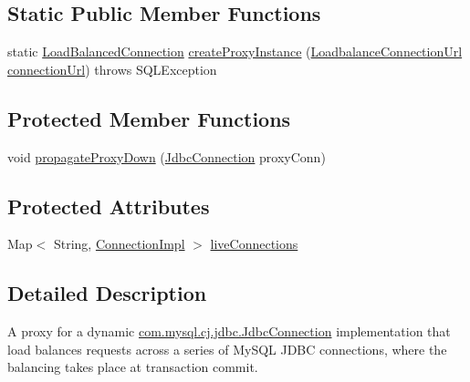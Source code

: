 \subsection*{Static Public Member Functions}
\begin{DoxyCompactItemize}
\item 
static \mbox{\hyperlink{interfacecom_1_1mysql_1_1cj_1_1jdbc_1_1ha_1_1_load_balanced_connection}{Load\+Balanced\+Connection}} \mbox{\hyperlink{classcom_1_1mysql_1_1cj_1_1jdbc_1_1ha_1_1_load_balanced_connection_proxy_afc3968a242b38d47fdd116d3fdb8ac73}{create\+Proxy\+Instance}} (\mbox{\hyperlink{classcom_1_1mysql_1_1cj_1_1conf_1_1url_1_1_loadbalance_connection_url}{Loadbalance\+Connection\+Url}} \mbox{\hyperlink{classcom_1_1mysql_1_1cj_1_1jdbc_1_1ha_1_1_multi_host_connection_proxy_aae3d1ff31056ba5a6686ce6e692a64a8}{connection\+Url}})  throws S\+Q\+L\+Exception 
\end{DoxyCompactItemize}
\subsection*{Protected Member Functions}
\begin{DoxyCompactItemize}
\item 
void \mbox{\hyperlink{classcom_1_1mysql_1_1cj_1_1jdbc_1_1ha_1_1_load_balanced_connection_proxy_a881993ea0bb478eade30076498853833}{propagate\+Proxy\+Down}} (\mbox{\hyperlink{interfacecom_1_1mysql_1_1cj_1_1jdbc_1_1_jdbc_connection}{Jdbc\+Connection}} proxy\+Conn)
\end{DoxyCompactItemize}
\subsection*{Protected Attributes}
\begin{DoxyCompactItemize}
\item 
Map$<$ String, \mbox{\hyperlink{classcom_1_1mysql_1_1cj_1_1jdbc_1_1_connection_impl}{Connection\+Impl}} $>$ \mbox{\hyperlink{classcom_1_1mysql_1_1cj_1_1jdbc_1_1ha_1_1_load_balanced_connection_proxy_a675cf5baac8ce2e4d6ba049def5a373e}{live\+Connections}}
\end{DoxyCompactItemize}


\subsection{Detailed Description}
A proxy for a dynamic \mbox{\hyperlink{interfacecom_1_1mysql_1_1cj_1_1jdbc_1_1_jdbc_connection}{com.\+mysql.\+cj.\+jdbc.\+Jdbc\+Connection}} implementation that load balances requests across a series of My\+S\+QL J\+D\+BC connections, where the balancing takes place at transaction commit.

